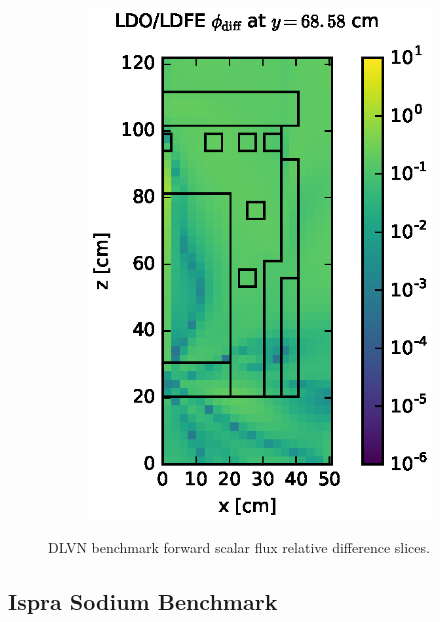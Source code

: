 \begin{figure}[!hbt]
\begin{subfigure}{0.4\textwidth}
\includegraphics[max height=0.445\textheight]
{img/dlvn-plots/fwd/flux-diff-rel-ldfe01.eps}
\end{subfigure}
\caption{DLVN benchmark forward scalar flux relative difference slices.}
\label{dlvn-fwd-diff-rel}
\end{figure}

\FloatBarrier
\subsection{Ispra Sodium Benchmark}
\label{sec:eurac-fwd}

